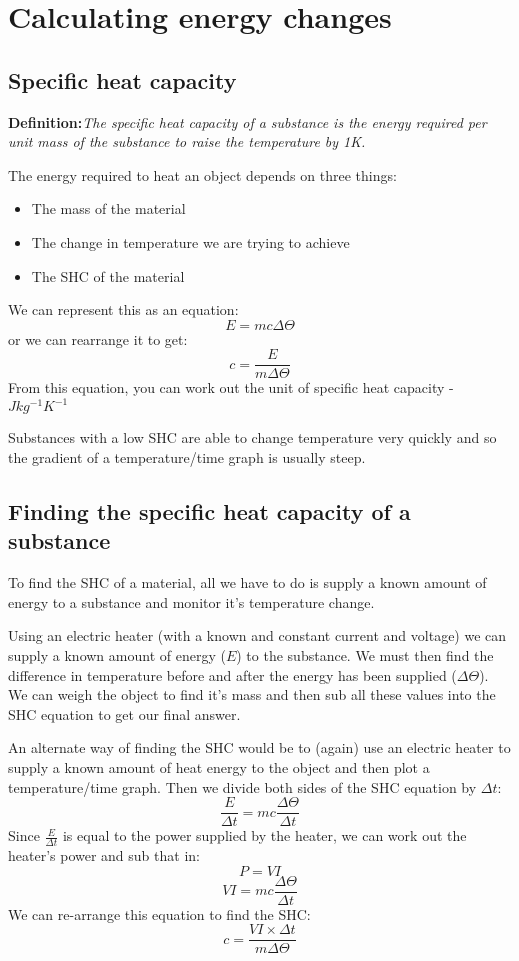 \documentclass{article}
\begin{document}
\section*{Calculating energy changes}
\subsection*{Specific heat capacity}
\textbf{Definition:}\textit{The specific heat capacity of a substance is the energy required per unit mass of the substance to raise the temperature by 1K.}

The energy required to heat an object depends on three things:
\begin{itemize}
	\item The mass of the material
	\item The change in temperature we are trying to achieve
	\item The SHC of the material
\end{itemize}

We can represent this as an equation:
\[
	E = mc \Delta \Theta
\]
or we can rearrange it to get:
\[
	c = \frac{E}{m \Delta \Theta}
\]
From this equation, you can work out the unit of specific heat capacity - $J kg^{-1} K^{-1}$

Substances with a low SHC are able to change temperature very quickly and so the gradient of a temperature/time graph is usually steep.

\subsection*{Finding the specific heat capacity of a substance}
To find the SHC of a material, all we have to do is supply a known amount of energy to a substance and monitor it's temperature change.

Using an electric heater (with a known and constant current and voltage) we can supply a known amount of energy ($E$) to the substance. We must then find the difference in temperature before and after the energy has been supplied ($\Delta \Theta$). We can weigh the object to find it's mass and then sub all these values into the SHC equation to get our final answer.

An alternate way of finding the SHC would be to (again) use an electric heater to supply a known amount of heat energy to the object and then plot a temperature/time graph. Then we divide both sides of the SHC equation by $\Delta t$:
\[
	\frac{E}{\Delta t} = mc\frac{\Delta \Theta}{\Delta t}
\]
Since $\frac{E}{\Delta t}$ is equal to the power supplied by the heater, we can work out the heater's power and sub that in:
\[
	P = VI
\]
\[
	VI = mc\frac{\Delta \Theta}{\Delta t}
\]
We can re-arrange this equation to find the SHC:
\[
	c = \frac{VI \times \Delta t}{m \Delta \Theta}
\]
\end{document}

